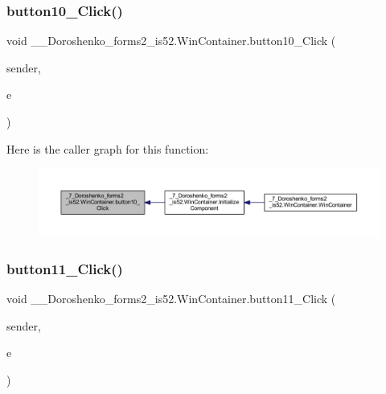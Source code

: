 \subsubsection{\texorpdfstring{button10\+\_\+\+Click()}{button10\_Click()}}
{\footnotesize\ttfamily void \+\_\+\_\+\+Doroshenko\+\_\+forms2\+\_\+is52.\+Win\+Container.\+button10\+\_\+\+Click (\begin{DoxyParamCaption}\item[{object}]{sender,  }\item[{Event\+Args}]{e }\end{DoxyParamCaption})\hspace{0.3cm}{\ttfamily [private]}}

Here is the caller graph for this function\+:
\nopagebreak
\begin{figure}[H]
\begin{center}
\leavevmode
\includegraphics[width=350pt]{class__7___doroshenko__forms2__is52_1_1_win_container_a6afaa8f33f51c512b4ef25f24f2cba7a_icgraph}
\end{center}
\end{figure}
\hypertarget{class__7___doroshenko__forms2__is52_1_1_win_container_add06f6a4a96485f5434f2f47b92f1f90}{}\label{class__7___doroshenko__forms2__is52_1_1_win_container_add06f6a4a96485f5434f2f47b92f1f90} 
\subsubsection{\texorpdfstring{button11\+\_\+\+Click()}{button11\_Click()}}
{\footnotesize\ttfamily void \+\_\+\_\+\+Doroshenko\+\_\+forms2\+\_\+is52.\+Win\+Container.\+button11\+\_\+\+Click (\begin{DoxyParamCaption}\item[{object}]{sender,  }\item[{Event\+Args}]{e }\end{DoxyParamCaption})\hspace{0.3cm}{\ttfamily [private]}}

